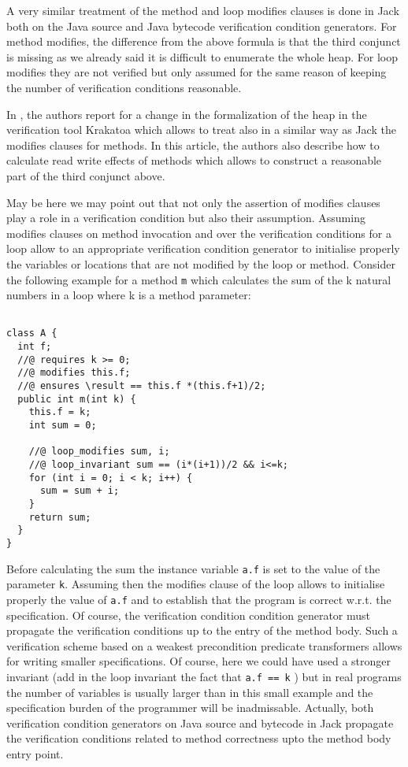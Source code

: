 A very similar treatment of the  method and loop modifies clauses is done in Jack both on the Java source and Java bytecode verification condition generators.
For method modifies,  the difference  from the above formula is that the third conjunct is missing as we already said it is difficult to enumerate the 
whole heap. For loop modifies they are not verified but only assumed for the same reason of keeping the number of verification conditions reasonable. 


 In \cite{marche05tphols}, the authors report for a change in the formalization of the heap in the verification tool Krakatoa which allows
to treat also in a similar way as Jack the modifies clauses for methods. In this article, the authors also describe how to calculate read write effects of methods which
 allows  to construct a reasonable part of the  third conjunct above. 

May be here we may point out that not only the assertion of modifies clauses play a role in a verification condition but also their assumption.
Assuming  modifies clauses on method invocation  and over the verification conditions for a loop allow to an appropriate verification condition generator to
 initialise properly the variables or locations that are not modified by the loop or method. Consider the following example for a method
 \lstinline!m! which calculates the sum of the k natural numbers in a loop where k is a method parameter:


\begin{lstlisting}[frame=trbl]

class A { 
  int f;
  //@ requires k >= 0;
  //@ modifies this.f;
  //@ ensures \result == this.f *(this.f+1)/2;
  public int m(int k) {
    this.f = k;
    int sum = 0;
	    
    //@ loop_modifies sum, i;
    //@ loop_invariant sum == (i*(i+1))/2 && i<=k;
    for (int i = 0; i < k; i++) {
      sum = sum + i;
    }
    return sum;
  }
}
\end{lstlisting} 

 Before calculating the sum the instance variable \lstinline!a.f! is set to the value of the parameter  \lstinline!k!.
 Assuming then the modifies clause of the loop allows to initialise properly the value of \lstinline!a.f! and to  establish that
 the program  is correct w.r.t. the specification. Of course, the verification condition condition generator 
 must propagate the verification conditions up to the entry of the method body. 
 Such a verification  scheme based on a weakest precondition predicate transformers allows for writing smaller specifications. 
 Of course, here we could have used a stronger invariant (add in the loop invariant the fact that \lstinline!a.f == k! )
 but in real programs the number of variables is usually larger than in this small example and the specification burden of the programmer will be inadmissable.
 Actually, both verification condition generators on  Java source and bytecode in Jack propagate the verification conditions related to method correctness
 upto the method body entry point. 

